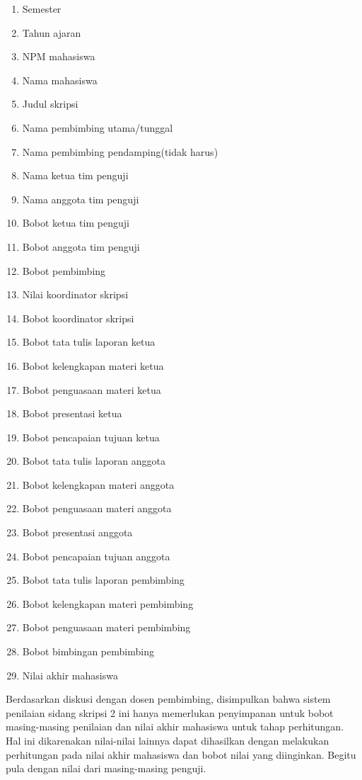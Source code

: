 		\begin{enumerate}
			\item Semester
			\item Tahun ajaran
			\item NPM mahasiswa 
			\item Nama mahasiswa
			\item Judul skripsi
			\item Nama pembimbing utama/tunggal
			\item Nama pembimbing pendamping(tidak harus)
			\item Nama ketua tim penguji
			\item Nama anggota tim penguji
			\item Bobot ketua tim penguji
			\item Bobot anggota tim penguji
			\item Bobot pembimbing
			\item Nilai koordinator skripsi
			\item Bobot koordinator skripsi
			\item Bobot tata tulis laporan ketua
			\item Bobot kelengkapan materi ketua
			\item Bobot penguasaan materi ketua
			\item Bobot presentasi ketua
			\item Bobot pencapaian tujuan ketua
			\item Bobot tata tulis laporan anggota
			\item Bobot kelengkapan materi anggota
			\item Bobot penguasaan materi anggota
			\item Bobot presentasi anggota
			\item Bobot pencapaian tujuan anggota
			\item Bobot tata tulis laporan pembimbing
			\item Bobot kelengkapan materi pembimbing
			\item Bobot penguasaan materi pembimbing
			\item Bobot bimbingan pembimbing
			\item Nilai akhir mahasiswa
		\end{enumerate}
	
	Berdasarkan diskusi dengan dosen pembimbing, disimpulkan bahwa sistem penilaian sidang skripsi 2 ini hanya memerlukan penyimpanan untuk bobot masing-masing penilaian dan nilai akhir mahasiswa untuk tahap perhitungan. Hal ini dikarenakan nilai-nilai lainnya dapat dihasilkan dengan melakukan perhitungan pada  nilai akhir mahasiswa dan bobot nilai yang diinginkan. Begitu pula dengan nilai dari masing-masing penguji.
	
